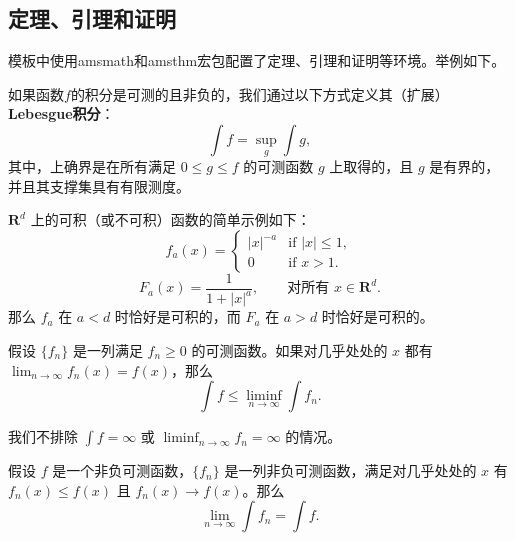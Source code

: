 \subsection{定理、引理和证明}
模板中使用amsmath和amsthm宏包配置了定理、引理和证明等环境。举例如下。
\begin{definition}
  如果函数$f$的积分是可测的且非负的，我们通过以下方式定义其（扩展）\textbf{Lebesgue积分}：
  \begin{equation}
  \int f = \sup_g \int g,
  \end{equation}
  其中，上确界是在所有满足 $0 \leq g \leq f$ 的可测函数 $g$ 上取得的，且 $g$ 是有界的，并且其支撑集具有有限测度。
\end{definition}

\begin{example}
  $\mathbf{R}^d$ 上的可积（或不可积）函数的简单示例如下：
  \begin{equation}
  f_a(x) =
  \begin{cases}
  |x|^{-a} & \text{if } |x| \leq 1,\\
  0 & \text{if } x > 1.
  \end{cases}
  \end{equation}
  \begin{equation}
  F_a(x) = \frac{1}{1 + |x|^a}, \qquad \text{对所有~} x \in \mathbf{R}^d.
  \end{equation}
  那么 $f_a$ 在 $a < d$ 时恰好是可积的，而 $F_a$ 在 $a > d$ 时恰好是可积的。
\end{example}

\begin{lemma}[Fatou]
  假设 $\{f_n\}$ 是一列满足 $f_n \geq 0$ 的可测函数。如果对几乎处处的 $x$ 都有 $\lim_{n \to \infty} f_n(x) = f(x)$，那么
  \begin{equation}
  \int f \leq \liminf_{n \to \infty} \int f_n.
  \end{equation}
\end{lemma}

\begin{remark}
  我们不排除 $\int f = \infty$ 或 $\liminf_{n \to \infty} f_n = \infty$ 的情况。
\end{remark}

\begin{corollary}
  假设 $f$ 是一个非负可测函数，$\{f_n\}$ 是一列非负可测函数，满足对几乎处处的 $x$ 有 $f_n(x) \leq f(x)$ 且 $f_n(x) \to f(x)$。那么
  \begin{equation}
  \lim_{n \to \infty} \int f_n = \int f.
  \end{equation}
\end{corollary}


